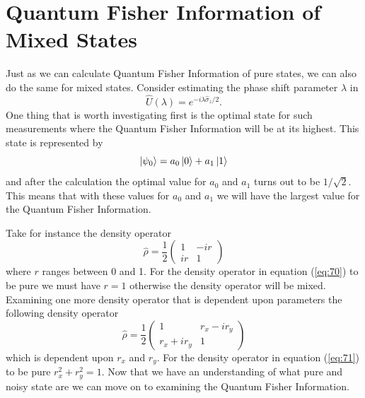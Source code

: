 \documentclass[twocolumn]{article}
\begin{document}
\section*{Quantum Fisher Information of Mixed States}
Just as we can calculate Quantum Fisher Information of pure states, we can also do the same for mixed states. Consider estimating the phase shift parameter $\lambda$ in
\begin{equation} \label{eq:68}
\hat{U}(\lambda)=e^{-i\lambda\hat{\sigma}_z/2}.
\end{equation}
One thing that is worth investigating first is the optimal state for such measurements where the Quantum Fisher Information will be at its highest. This state is represented by
\begin{equation} \label{eq:69}
\ket{\psi_0}=a_0\ket{0}+a_1\ket{1}
\end{equation}
and after the calculation the optimal value for $a_0$ and $a_1$ turns out to be $1/\sqrt{2}$. This means that with these values for $a_0$ and $a_1$ we will have the largest value for the Quantum Fisher Information. 

Take for instance the density operator
\begin{equation} \label{eq:70}
\hat{\rho}=\frac{1}{2}
\begin{pmatrix}
1 & -ir \\
ir & 1
\end{pmatrix}
\end{equation}
where $r$ ranges between 0 and 1. For the density operator in equation (\ref{eq:70}) to be pure we must have $r=1$ otherwise the density operator will be mixed. Examining one more density operator that is dependent upon parameters the following density operator 
\begin{equation} \label{eq:71}
\hat{\rho}=\frac{1}{2}
\begin{pmatrix}
1 & r_x-ir_y \\
r_x+ir_y & 1
\end{pmatrix}
\end{equation}
which is dependent upon $r_x$ and $r_y$. For the density operator in equation (\ref{eq:71}) to be pure $r_x^2+r_y^2=1$. Now that we have an understanding of what pure and noisy state are we can move on to examining the Quantum Fisher Information.
\end{document}
